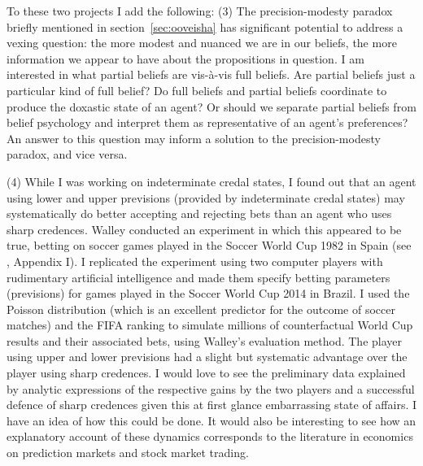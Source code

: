 \documentclass[phd,12pt,oneside]{ubcthesis}
\begin{document}
To these two projects I add the following: (3) The precision-modesty
paradox briefly mentioned in section~\ref{sec:ooveisha} has
significant potential to address a vexing question: the more modest
and nuanced we are in our beliefs, the more information we appear to
have about the propositions in question. I am interested in what
partial beliefs are vis-{\`a}-vis full beliefs. Are partial beliefs
just a particular kind of full belief? Do full beliefs and partial
beliefs coordinate to produce the doxastic state of an agent? Or
should we separate partial beliefs from belief psychology and
interpret them as representative of an agent's preferences? An answer
to this question may inform a solution to the precision-modesty
paradox, and vice versa.

(4) While I was working on indeterminate credal states, I found out
that an agent using lower and upper previsions (provided by
indeterminate credal states) may systematically do better accepting
and rejecting bets than an agent who uses sharp credences. Walley
conducted an experiment in which this appeared to be true, betting on
soccer games played in the Soccer World Cup 1982 in Spain (see
, Appendix I). I replicated the experiment using
two computer players with rudimentary artificial intelligence and made
them specify betting parameters (previsions) for games played in the
Soccer World Cup 2014 in Brazil. I used the Poisson distribution
(which is an excellent predictor for the outcome of soccer matches)
and the FIFA ranking to simulate millions of counterfactual World Cup
results and their associated bets, using Walley's evaluation method.
The player using upper and lower previsions had a slight but
systematic advantage over the player using sharp credences. I would
love to see the preliminary data explained by analytic expressions of
the respective gains by the two players and a successful defence of
sharp credences given this at first glance embarrassing state of
affairs. I have an idea of how this could be done. It would also be
interesting to see how an explanatory account of these dynamics
corresponds to the literature in economics on prediction markets and
stock market trading.
\end{document}
